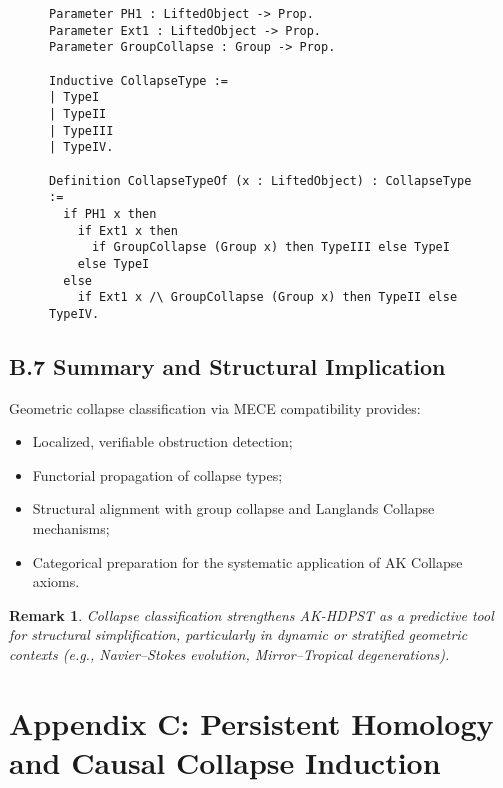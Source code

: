 \documentclass[11pt]{article}
\newtheorem{remark}[theorem]{Remark}
\begin{document}
\begin{figure}[h]
\centering
\begin{lstlisting}[language=Coq, caption=Collapse Type Assignment]
Parameter PH1 : LiftedObject -> Prop.
Parameter Ext1 : LiftedObject -> Prop.
Parameter GroupCollapse : Group -> Prop.

Inductive CollapseType :=
| TypeI
| TypeII
| TypeIII
| TypeIV.

Definition CollapseTypeOf (x : LiftedObject) : CollapseType :=
  if PH1 x then
    if Ext1 x then
      if GroupCollapse (Group x) then TypeIII else TypeI
    else TypeI
  else
    if Ext1 x /\ GroupCollapse (Group x) then TypeII else TypeIV.
\end{lstlisting}
\end{figure}

\subsection*{B.7 Summary and Structural Implication}

Geometric collapse classification via MECE compatibility provides:

\begin{itemize}
    \item Localized, verifiable obstruction detection;
    \item Functorial propagation of collapse types;
    \item Structural alignment with group collapse and Langlands Collapse mechanisms;
    \item Categorical preparation for the systematic application of AK Collapse axioms.
\end{itemize}

\begin{remark}
Collapse classification strengthens AK-HDPST as a predictive tool for structural simplification, particularly in dynamic or stratified geometric contexts (e.g., Navier–Stokes evolution, Mirror–Tropical degenerations).
\end{remark}



\section*{Appendix C: Persistent Homology and Causal Collapse Induction}
\end{document}
